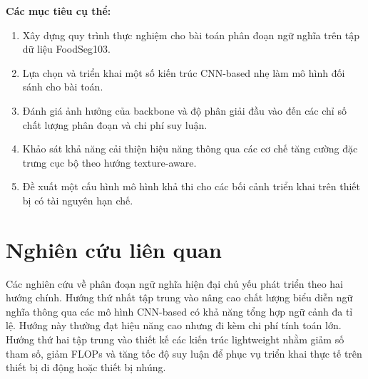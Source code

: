 \textbf{Các mục tiêu cụ thể:}
\begin{enumerate}
\item Xây dựng quy trình thực nghiệm cho bài toán phân đoạn ngữ nghĩa trên tập dữ liệu FoodSeg103.
\item Lựa chọn và triển khai một số kiến trúc CNN-based nhẹ làm mô hình đối sánh cho bài toán.
\item Đánh giá ảnh hưởng của backbone và độ phân giải đầu vào đến các chỉ số chất lượng phân đoạn và chi phí suy luận.
\item Khảo sát khả năng cải thiện hiệu năng thông qua các cơ chế tăng cường đặc trưng cục bộ theo hướng texture-aware.
\item Đề xuất một cấu hình mô hình khả thi cho các bối cảnh triển khai trên thiết bị có tài nguyên hạn chế.
\end{enumerate}






\section{Nghiên cứu liên quan}
Các nghiên cứu về phân đoạn ngữ nghĩa hiện đại chủ yếu phát triển theo hai hướng chính. Hướng thứ nhất tập trung vào nâng cao chất lượng biểu diễn ngữ nghĩa thông qua các mô hình CNN-based có khả năng tổng hợp ngữ cảnh đa tỉ lệ. Hướng này thường đạt hiệu năng cao nhưng đi kèm chi phí tính toán lớn. Hướng thứ hai tập trung vào thiết kế các kiến trúc lightweight nhằm giảm số tham số, giảm FLOPs và tăng tốc độ suy luận để phục vụ triển khai thực tế trên thiết bị di động hoặc thiết bị nhúng.

